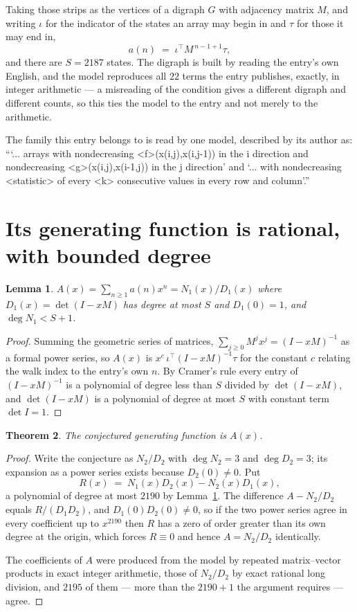 \documentclass[11pt,a4paper]{article}
\theoremstyle{plain}
\newtheorem{theorem}{Theorem}
\newtheorem{lemma}[theorem]{Lemma}
\theoremstyle{definition}
\begin{document}
Taking those strips as the vertices of a digraph $G$ with adjacency matrix $M$, and writing
$\iota$ for the indicator of the states an array may begin in and $\tau$ for those it may end
in,
\[
a(n)\;=\;\iota^{\!\top}M^{\,n-1+1}\tau ,
\]
and there are $S=2187$ states. The digraph is built by reading the entry's own English, and the
model reproduces all $22$ terms the entry publishes, exactly, in integer arithmetic --- a
misreading of the condition gives a different digraph and different counts, so this ties the
model to the entry and not merely to the arithmetic.

The family this entry belongs to is read by one model, described by its author as: ```... arrays with nondecreasing <f>(x(i,j),x(i,j-1)) in the i direction and nondecreasing <g>(x(i,j),x(i-1,j)) in the j direction' and `... with nondecreasing <statistic> of every <k> consecutive values in every row and column'.''


\section{Its generating function is rational, with bounded degree}

\begin{lemma}\label{lem:rat}
$A(x)=\sum_{n\ge1}a(n)x^n=N_1(x)/D_1(x)$ where $D_1(x)=\det(I-xM)$ has degree at most
$S$ and $D_1(0)=1$, and $\deg N_1<S+1$.
\end{lemma}

\begin{proof}
Summing the geometric series of matrices, $\sum_{j\ge0}M^jx^j=(I-xM)^{-1}$ as a formal
power series, so $A(x)$ is $x^{c}\,\iota^{\!\top}(I-xM)^{-1}\tau$ for the constant $c$
relating the walk index to the entry's own $n$. By Cramer's rule every entry of
$(I-xM)^{-1}$ is a polynomial of degree less than $S$ divided by $\det(I-xM)$, and
$\det(I-xM)$ is a polynomial of degree at most $S$ with constant term $\det I=1$.
\end{proof}

\begin{theorem}
The conjectured generating function is $A(x)$.
\end{theorem}

\begin{proof}
Write the conjecture as $N_2/D_2$ with $\deg N_2=3$ and $\deg D_2=3$; its expansion as a
power series exists because $D_2(0)\neq0$. Put
\[
R(x)\;=\;N_1(x)D_2(x)-N_2(x)D_1(x),
\]
a polynomial of degree at most $2190$ by Lemma~\ref{lem:rat}. The difference
$A-N_2/D_2$ equals $R/(D_1D_2)$, and $D_1(0)D_2(0)\neq0$, so if the two power series agree in
every coefficient up to $x^{2190}$ then $R$ has a zero of order greater than its own
degree at the origin, which forces $R\equiv0$ and hence $A=N_2/D_2$ identically.

The coefficients of $A$ were produced from the model by repeated matrix--vector products in
exact integer arithmetic, those of $N_2/D_2$ by exact rational long division, and $2195$
of them --- more than the $2190+1$ the argument requires --- agree.
\end{proof}
\end{document}
